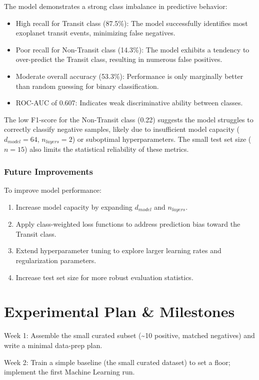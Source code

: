 \documentclass[letterpaper]{article} %
\begin{document}
The model demonstrates a strong class imbalance in predictive behavior:
\begin{itemize}
    \item{High recall for Transit class (87.5\%):} The model successfully identifies most exoplanet transit events, minimizing false negatives.
    \item{Poor recall for Non-Transit class (14.3\%):} The model exhibits a tendency to over-predict the Transit class, resulting in numerous false positives.
    \item{Moderate overall accuracy (53.3\%):} Performance is only marginally better than random guessing for binary classification.
    \item{ROC-AUC of 0.607:} Indicates weak discriminative ability between classes.
\end{itemize}

The low F1-score for the Non-Transit class (0.22) suggests the model struggles to correctly classify negative samples, likely due to insufficient model capacity (\(d_{model}=64\), \(n_{layers}=2\)) or suboptimal hyperparameters. The small test set size (\(n=15\)) also limits the statistical reliability of these metrics.

\subsubsection*{Future Improvements}

To improve model performance:
\begin{enumerate}
    \item Increase model capacity by expanding \(d_{model}\) and \(n_{layers}\).
    \item Apply class-weighted loss functions to address prediction bias toward the Transit class.
    \item Extend hyperparameter tuning to explore larger learning rates and regularization parameters.
    \item Increase test set size for more robust evaluation statistics.
\end{enumerate}


\section*{Experimental Plan \& Milestones}
Week 1: Assemble the small curated subset (\textasciitilde{}10 positive, matched negatives) and write a minimal data-prep plan.

Week 2: Train a simple baseline (the small curated dataset) to set a floor; implement the first Machine Learning run.
\end{document}

